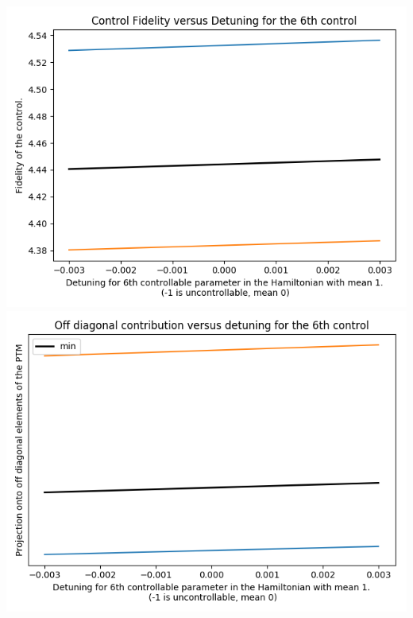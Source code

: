 \documentclass{article}
\begin{document}
\begin{center}
\includegraphics[scale=.9]{control_fid_7}
\includegraphics[scale=.9]{off_diag_7}

\end{center}
\end{document}
